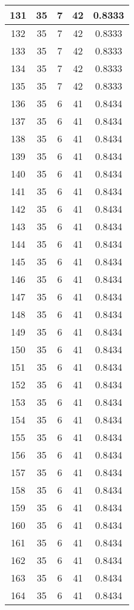 \documentclass[letterpaper, 12pt]{article}
\begin{document}
\begin{longtable}{|c|c|c|c|c|}
\hline
131 & 35 & 7 & 42 & 0.8333 \\
\hline
132 & 35 & 7 & 42 & 0.8333 \\
\hline
133 & 35 & 7 & 42 & 0.8333 \\
\hline
134 & 35 & 7 & 42 & 0.8333 \\
\hline
135 & 35 & 7 & 42 & 0.8333 \\
\hline
136 & 35 & 6 & 41 & 0.8434 \\
\hline
137 & 35 & 6 & 41 & 0.8434 \\
\hline
138 & 35 & 6 & 41 & 0.8434 \\
\hline
139 & 35 & 6 & 41 & 0.8434 \\
\hline
140 & 35 & 6 & 41 & 0.8434 \\
\hline
141 & 35 & 6 & 41 & 0.8434 \\
\hline
142 & 35 & 6 & 41 & 0.8434 \\
\hline
143 & 35 & 6 & 41 & 0.8434 \\
\hline
144 & 35 & 6 & 41 & 0.8434 \\
\hline
145 & 35 & 6 & 41 & 0.8434 \\
\hline
146 & 35 & 6 & 41 & 0.8434 \\
\hline
147 & 35 & 6 & 41 & 0.8434 \\
\hline
148 & 35 & 6 & 41 & 0.8434 \\
\hline
149 & 35 & 6 & 41 & 0.8434 \\
\hline
150 & 35 & 6 & 41 & 0.8434 \\
\hline
151 & 35 & 6 & 41 & 0.8434 \\
\hline
152 & 35 & 6 & 41 & 0.8434 \\
\hline
153 & 35 & 6 & 41 & 0.8434 \\
\hline
154 & 35 & 6 & 41 & 0.8434 \\
\hline
155 & 35 & 6 & 41 & 0.8434 \\
\hline
156 & 35 & 6 & 41 & 0.8434 \\
\hline
157 & 35 & 6 & 41 & 0.8434 \\
\hline
158 & 35 & 6 & 41 & 0.8434 \\
\hline
159 & 35 & 6 & 41 & 0.8434 \\
\hline
160 & 35 & 6 & 41 & 0.8434 \\
\hline
161 & 35 & 6 & 41 & 0.8434 \\
\hline
162 & 35 & 6 & 41 & 0.8434 \\
\hline
163 & 35 & 6 & 41 & 0.8434 \\
\hline
164 & 35 & 6 & 41 & 0.8434 \\

\end{longtable}
\end{document}
